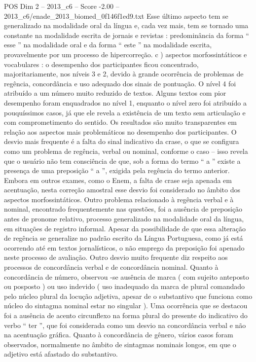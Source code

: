 \begin{textsample}{POS Dim 2 – 2013\_c6 – Score -2.00 – 2013\_c6/enade\_2013\_biomed\_0f146f1ed9.txt}
Esse último aspecto tem se generalizado na modalidade oral da língua e, cada vez mais, tem se tornado uma constante na modalidade escrita de jornais e revistas : predominância da forma “ esse ” na modalidade oral e da forma “ este ” na modalidade escrita, provavelmente por um processo de hipercorreção. c ) aspectos morfossintáticos e vocabulares : o desempenho dos participantes ficou concentrado, majoritariamente, nos níveis 3 e 2, devido à grande ocorrência de problemas de regência, concordância e uso adequado dos sinais de pontuação.
O nível 4 foi atribuído a um número muito reduzido de textos.
Alguns textos com pior desempenho foram enquadrados no nível 1, enquanto o nível zero foi atribuído a pouquíssimos casos, já que ele revela a existência de um texto sem articulação e com comprometimento do sentido.
Os resultados são muito transparentes em relação aos aspectos mais problemáticos no desempenho dos participantes.
O desvio mais frequente é a falta do sinal indicativo da crase, o que se configura como um problema de regência, verbal ou nominal, conforme o caso – isso revela que o usuário não tem consciência de que, sob a forma do termo “ a ” existe a presença de uma preposição “ a ”, exigida pela regência do termo anterior.
Embora em outros exames, como o Enem, a falta de crase seja apenada em acentuação, nesta correção amostral esse desvio foi considerado no âmbito dos aspectos morfossintáticos.
Outro problema relacionado à regência verbal e à nominal, encontrado frequentemente nas questões, foi a ausência de preposição antes de pronome relativo, processo generalizado na modalidade oral da língua, em situações de registro informal.
Apesar da possibilidade de que essa alteração de regência se generalize no padrão escrito da Língua Portuguesa, como já está ocorrendo até em textos jornalísticos, o não emprego da preposição foi apenado neste processo de avaliação.
Outro desvio muito frequente diz respeito aos processos de concordância verbal e de concordância nominal.
Quanto à concordância de número, observou -se ausência de marca ( com sujeito anteposto ou posposto ) ou uso indevido ( uso inadequado da marca de plural comandado pelo núcleo plural da locução adjetiva, apesar de o substantivo que funciona como núcleo do sintagma nominal estar no singular ).
Uma ocorrência que se destacou foi a ausência de acento circunflexo na forma plural do presente do indicativo do verbo “ ter ”, que foi considerada como um desvio na concordância verbal e não na acentuação gráfica.
Quanto à concordância de gênero, vários casos foram observados, normalmente no âmbito de sintagmas nominais longos, em que o adjetivo está afastado do substantivo.

\end{textsample}
